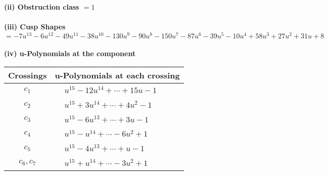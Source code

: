 \documentclass[1p]{elsarticle_modified}
\theoremstyle{definition}
\begin{document}
\flushleft \textbf{(ii) Obstruction class $= 1$}\\~\\
\flushleft \textbf{(iii) Cusp Shapes $= -7 u^{13}-6 u^{12}-49 u^{11}-38 u^{10}-130 u^9-90 u^8-150 u^7-87 u^6-39 u^5-10 u^4+58 u^3+27 u^2+31 u+8$}\\~\\
\newpage\renewcommand{\arraystretch}{1}
\flushleft \textbf{(iv) u-Polynomials at the component}\newline \\
\begin{tabular}{m{50pt}|m{274pt}}
Crossings & \hspace{64pt}u-Polynomials at each crossing \\
\hline $$\begin{aligned}c_{1}\end{aligned}$$&$\begin{aligned}
&u^{15}-12 u^{14}+\cdots+15 u-1
\end{aligned}$\\
\hline $$\begin{aligned}c_{2}\end{aligned}$$&$\begin{aligned}
&u^{15}+3 u^{14}+\cdots+4 u^2-1
\end{aligned}$\\
\hline $$\begin{aligned}c_{3}\end{aligned}$$&$\begin{aligned}
&u^{15}-6 u^{13}+\cdots+3 u-1
\end{aligned}$\\
\hline $$\begin{aligned}c_{4}\end{aligned}$$&$\begin{aligned}
&u^{15}- u^{14}+\cdots-6 u^2+1
\end{aligned}$\\
\hline $$\begin{aligned}c_{5}\end{aligned}$$&$\begin{aligned}
&u^{15}-4 u^{13}+\cdots+u-1
\end{aligned}$\\
\hline $$\begin{aligned}c_{6},c_{7}\end{aligned}$$&$\begin{aligned}
&u^{15}+u^{14}+\cdots-3 u^2+1
\end{aligned}$\\

\end{tabular}
\end{document}
